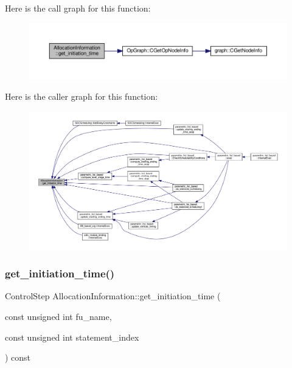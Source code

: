 Here is the call graph for this function\+:
\nopagebreak
\begin{figure}[H]
\begin{center}
\leavevmode
\includegraphics[width=350pt]{d7/d79/classAllocationInformation_a4e2b7808fff53d834b80063761b3d802_cgraph}
\end{center}
\end{figure}
Here is the caller graph for this function\+:
\nopagebreak
\begin{figure}[H]
\begin{center}
\leavevmode
\includegraphics[width=350pt]{d7/d79/classAllocationInformation_a4e2b7808fff53d834b80063761b3d802_icgraph}
\end{center}
\end{figure}
\mbox{\label{classAllocationInformation_acb8b91c250bba52b3f9ece7e9ff20a6e}} 
\subsubsection{\texorpdfstring{get\+\_\+initiation\+\_\+time()}{get\_initiation\_time()}\hspace{0.1cm}{\footnotesize\ttfamily [2/2]}}
{\footnotesize\ttfamily Control\+Step Allocation\+Information\+::get\+\_\+initiation\+\_\+time (\begin{DoxyParamCaption}\item[{const unsigned int}]{fu\+\_\+name,  }\item[{const unsigned int}]{statement\+\_\+index }\end{DoxyParamCaption}) const}



